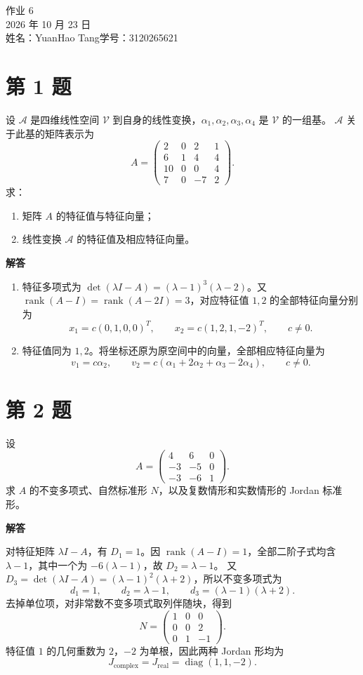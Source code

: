 \documentclass[UTF8,10pt,letterpaper,fontset=fandol]{ctexart}
\newcommand{\Solution}{\par\Needspace{4\baselineskip}\textbf{解答}\par}
\begin{document}
\begin{center}
{\LARGE 作业 6}\\[0.6em]
2026 年 10 月 23 日\\[0.25em]
姓名：YuanHao Tang\quad 学号：3120265621
\end{center}

\section{第 1 题}
设 $\mathcal A$ 是四维线性空间 $\mathcal V$ 到自身的线性变换，$\alpha_1,\alpha_2,\alpha_3,\alpha_4$ 是 $\mathcal V$ 的一组基。
$\mathcal A$ 关于此基的矩阵表示为
\[
A=\begin{pmatrix}2&0&2&1\\6&1&4&4\\10&0&0&4\\7&0&-7&2\end{pmatrix}.
\]
求：
\begin{enumerate}
\item 矩阵 $A$ 的特征值与特征向量；
\item 线性变换 $\mathcal A$ 的特征值及相应特征向量。
\end{enumerate}
\Solution
\begin{enumerate}
\item 特征多项式为 $\det(\lambda I-A)=(\lambda-1)^3(\lambda-2)$。又
$\operatorname{rank}(A-I)=\operatorname{rank}(A-2I)=3$，对应特征值 $1,2$ 的全部特征向量分别为
\[
\boxed{x_1=c(0,1,0,0)^T,\qquad x_2=c(1,2,1,-2)^T,\qquad c\ne0.}
\]
\item 特征值同为 $1,2$。将坐标还原为原空间中的向量，全部相应特征向量为
\[
\boxed{v_1=c\alpha_2,\qquad v_2=c(\alpha_1+2\alpha_2+\alpha_3-2\alpha_4),\qquad c\ne0.}
\]
\end{enumerate}

\section{第 2 题}
设
\[
A=\begin{pmatrix}4&6&0\\-3&-5&0\\-3&-6&1\end{pmatrix}.
\]
求 $A$ 的不变多项式、自然标准形 $N$，以及复数情形和实数情形的 Jordan 标准形。
\Solution
对特征矩阵 $\lambda I-A$，有 $D_1=1$。因 $\operatorname{rank}(A-I)=1$，全部二阶子式均含 $\lambda-1$，其中一个为 $-6(\lambda-1)$，故 $D_2=\lambda-1$。
又 $D_3=\det(\lambda I-A)=(\lambda-1)^2(\lambda+2)$，所以不变多项式为
\[
\boxed{d_1=1,\qquad d_2=\lambda-1,\qquad d_3=(\lambda-1)(\lambda+2)}.
\]
去掉单位项，对非常数不变多项式取列伴随块，得到
\[
\boxed{N=\begin{pmatrix}1&0&0\\0&0&2\\0&1&-1\end{pmatrix}}.
\]
特征值 $1$ 的几何重数为 $2$，$-2$ 为单根，因此两种 Jordan 形均为
\[
\boxed{J_{\mathrm{complex}}=J_{\mathrm{real}}=\operatorname{diag}(1,1,-2)}.
\]
\end{document}
